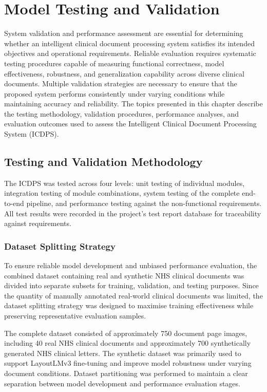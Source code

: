 \chapter{Model Testing and Validation}

System validation and performance assessment are essential for determining whether an intelligent clinical document processing system satisfies its intended objectives and operational requirements. Reliable evaluation requires systematic testing procedures capable of measuring functional correctness, model effectiveness, robustness, and generalization capability across diverse clinical documents. Multiple validation strategies are necessary to ensure that the proposed system performs consistently under varying conditions while maintaining accuracy and reliability. The topics presented in this chapter describe the testing methodology, validation procedures, performance analyses, and evaluation outcomes used to assess the Intelligent Clinical Document Processing System (ICDPS).

\section{Testing and Validation Methodology}

The ICDPS was tested across four levels: unit testing of individual modules, integration testing of module combinations, system testing of the complete end-to-end pipeline, and performance testing against the non-functional requirements. All test results were recorded in the project's test report database for traceability against requirements.

\subsection{Dataset Splitting Strategy}
To ensure reliable model development and unbiased performance evaluation, the combined dataset containing real and synthetic NHS clinical documents was divided into separate subsets for training, validation, and testing purposes. Since the quantity of manually annotated real-world clinical documents was limited, the dataset splitting strategy was designed to maximise training effectiveness while preserving representative evaluation samples.

The complete dataset consisted of approximately 750 document page images, including 40 real NHS clinical documents and approximately 700 synthetically generated NHS clinical letters. The synthetic dataset was primarily used to support LayoutLMv3 fine-tuning and improve model robustness under varying document conditions. Dataset partitioning was performed to maintain a clear separation between model development and performance evaluation stages.

